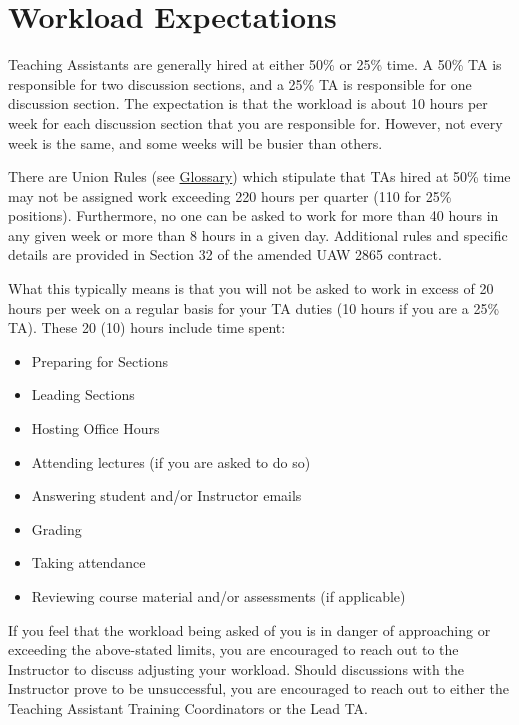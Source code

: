 \documentclass[
  letterpaper,
  DIV=11,
  numbers=noendperiod]{scrreprt}
\providecommand{\tightlist}{%
  \setlength{\itemsep}{0pt}\setlength{\parskip}{0pt}}\usepackage{longtable,booktabs,array}
\begin{document}
\hypertarget{workload-expectations}{%
\chapter{Workload Expectations}\label{workload-expectations}}

Teaching Assistants are generally hired at either 50\% or 25\% time. A
50\% TA is responsible for two discussion sections, and a 25\% TA is
responsible for one discussion section. The expectation is that the
workload is about 10 hours per week for each discussion section that you
are responsible for. However, not every week is the same, and some weeks
will be busier than others.

There are Union Rules (see \protect\hyperlink{glossary-1}{Glossary})
which stipulate that TAs hired at 50\% time may not be assigned work
exceeding 220 hours per quarter (110 for 25\% positions). Furthermore,
no one can be asked to work for more than 40 hours in any given week or
more than 8 hours in a given day. Additional rules and specific details
are provided in Section 32 of the amended UAW 2865 contract.

What this typically means is that you will not be asked to work in
excess of 20 hours per week on a regular basis for your TA duties (10
hours if you are a 25\% TA). These 20 (10) hours include time spent:

\begin{itemize}
\tightlist
\item
  Preparing for Sections
\item
  Leading Sections
\item
  Hosting Office Hours
\item
  Attending lectures (if you are asked to do so)
\item
  Answering student and/or Instructor emails
\item
  Grading
\item
  Taking attendance
\item
  Reviewing course material and/or assessments (if applicable)
\end{itemize}

If you feel that the workload being asked of you is in danger of
approaching or exceeding the above-stated limits, you are encouraged to
reach out to the Instructor to discuss adjusting your workload. Should
discussions with the Instructor prove to be unsuccessful, you are
encouraged to reach out to either the Teaching Assistant Training
Coordinators or the Lead TA.
\end{document}

